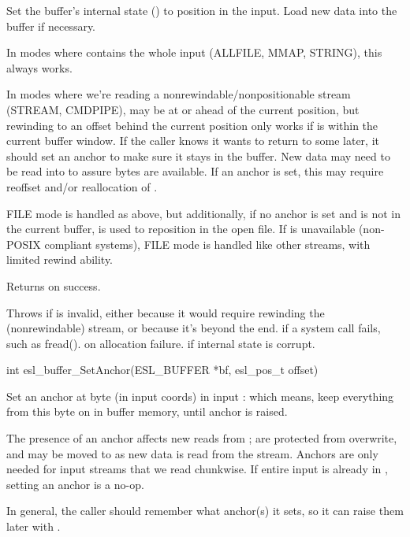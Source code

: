 \begin{sreapi}
Set the buffer's internal state () to position
 in the input. Load new data into the buffer if
necessary.

In modes where  contains the whole input
(ALLFILE, MMAP, STRING), this always works.

In modes where we're reading a
nonrewindable/nonpositionable stream (STREAM, CMDPIPE),
 may be at or ahead of the current position, but
rewinding to an offset behind the current position only
works if  is within the current buffer
window. If the caller knows it wants to return to some
 later, it should set an anchor to make sure it
stays in the buffer. New data may need to be read into
 to assure  bytes are available. If
an anchor is set, this may require reoffset and/or
reallocation of .

FILE mode is handled as above, but additionally, if no
anchor is set and  is not in the current buffer,
 is used to reposition in the open file. If
 is unavailable (non-POSIX compliant systems),
FILE mode is handled like other streams, with limited
rewind ability.

Returns  on success.

Throws  if  is invalid, either because it 
would require rewinding the (nonrewindable) stream, 
or because it's beyond the end.
 if a system call fails, such as fread().
 on allocation failure.
 if  internal state is corrupt.


\hypertarget{func:esl_buffer_SetAnchor()}
{\item[int esl\_buffer\_SetAnchor(ESL\_BUFFER *bf, esl\_pos\_t offset)]}

Set an anchor at byte  (in input coords) in
input : which means, keep everything from this byte
on in buffer memory, until anchor is raised.

The presence of an anchor affects new reads from ;
 are protected from overwrite, and may be
moved to  as new data is read from the
stream.  Anchors are only needed for input streams that
we read chunkwise.  If entire input is already in ,
setting an anchor is a no-op.

In general, the caller should remember what anchor(s) it
sets, so it can raise them later with
.


\end{sreapi}

